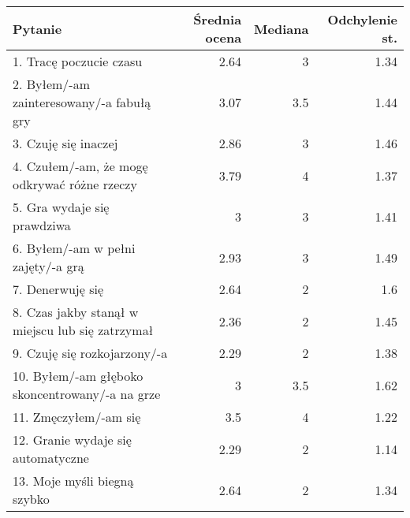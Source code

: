 \begin{table}[h!]
    \begin{center}
        \begin{tabular}{|m{10em}|r|r|r|}
            \hline
            Pytanie                                                           & Średnia ocena & Mediana & Odchylenie st. \\
            \hline
            1. Tracę poczucie czasu                                           & 2.64          & 3       & 1.34           \\
            2. Byłem/-am \newline zainteresowany/-a fabułą gry                & 3.07          & 3.5     & 1.44           \\
            3. Czuję się inaczej                                              & 2.86          & 3       & 1.46           \\
            4. Czułem/-am, że mogę odkrywać różne rzeczy                      & 3.79          & 4       & 1.37           \\
            5. Gra wydaje się prawdziwa                                       & 3             & 3       & 1.41           \\
            6. Byłem/-am \newline w pełni zajęty/-a grą                       & 2.93          & 3       & 1.49           \\
            7. Denerwuję się                                                  & 2.64          & 2       & 1.6            \\
            8. Czas jakby stanął w miejscu lub się zatrzymał                  & 2.36          & 2       & 1.45           \\
            9. Czuję się \newline rozkojarzony/-a                             & 2.29          & 2       & 1.38           \\
            10. Byłem/-am głęboko \newline skoncentrowany/-a \newline na grze & 3             & 3.5     & 1.62           \\
            11. Zmęczyłem/-am się                                             & 3.5           & 4       & 1.22           \\
            12. Granie wydaje się automatyczne                                & 2.29          & 2       & 1.14           \\
            13. Moje myśli \newline biegną szybko                             & 2.64          & 2       & 1.34           \\

\end{tabular}
\end{center}
\end{table}
